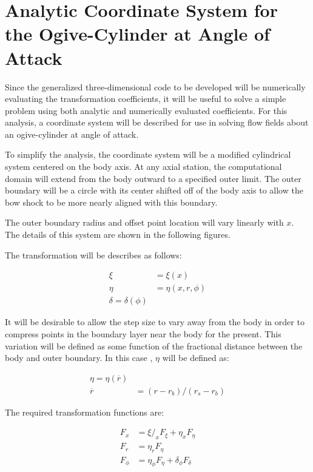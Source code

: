 \section{ Analytic Coordinate System for the Ogive-Cylinder at Angle of Attack}

Since the generalized three-dimensional code to be developed will be
numerically evaluating the transformation coefficients, it will be useful to
solve a simple problem using both analytic and numerically evaluated
coefficients. For this analysis, a coordinate system will be described for use
in solving flow fields about an ogive-cylinder at angle of attack.

To simplify the analysis, the coordinate system will be a modified cylindrical
system centered on the body axis. At any axial station, the computational
domain will extend from the body outward to a specified outer limit. The outer
boundary will be a circle with its center shifted off of the body axis to allow
the bow shock to be more nearly aligned with this boundary.

The outer boundary radius and offset point location will vary linearly with $x$.
The details of this system are shown in the following figures.


The transformation will be describes as follows:

\begin{equation}
\begin{aligned}
\xi &= \xi(x) \\
\eta &=  \eta(x,r,\phi) \\
\delta = \delta(\phi)
\end{aligned}
\end{equation}

It will be desirable to allow the step size to vary away from the body in order
to compress points in the boundary layer near the body for the present. This
variation will be defined as some function of the fractional distance between
the body and outer boundary. In this case , $\eta$ will be defined as:

\begin{equation}
\begin{aligned}
\eta = \eta(\overline{r}) \\
\overline{r} &= (r - r_b)/(r_s - r_b) 
\end{aligned}
\end{equation}

The required transformation functions are:

\begin{equation}
\begin{aligned}
F_x &= \xi/_x F_\xi + \eta_x F_\eta \\
F_r &= \eta_r F_\eta \\
F_\phi &= \eta_\phi F_\eta + \delta_\phi F_\delta
\end{aligned}
\end{equation}
